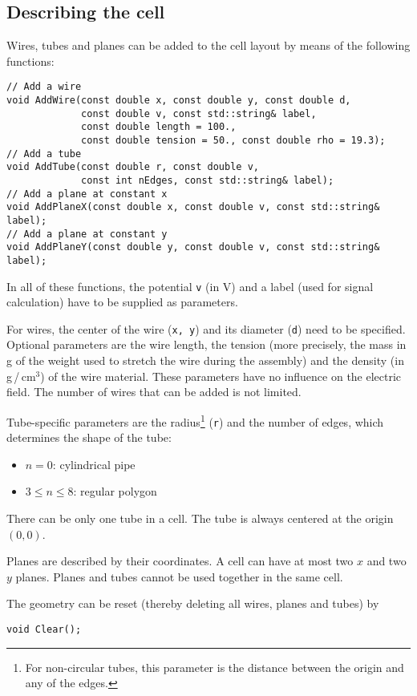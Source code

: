 \subsection{Describing the cell}

Wires, tubes and planes can be added to the cell layout by means of the 
following functions:
\begin{lstlisting}
// Add a wire
void AddWire(const double x, const double y, const double d,
             const double v, const std::string& label, 
             const double length = 100.,
             const double tension = 50., const double rho = 19.3);
// Add a tube
void AddTube(const double r, const double v, 
             const int nEdges, const std::string& label);
// Add a plane at constant x
void AddPlaneX(const double x, const double v, const std::string& label);
// Add a plane at constant y
void AddPlaneY(const double y, const double v, const std::string& label);

\end{lstlisting} 

In all of these functions, the potential \texttt{v} (in V) 
and a label (used for signal calculation) 
have to be supplied as parameters.
 
For wires, the center of the wire (\texttt{x, y}) 
and its diameter (\texttt{d}) need to be specified. 
Optional parameters are the wire length, the tension (more precisely, the 
mass in g of the weight used to stretch the wire during the assembly) and 
the density (in g\,/\,cm\(^{3}\)) of the wire material. 
These parameters have no influence on the electric field. 
The number of wires that can be added is not limited.

Tube-specific parameters are the radius\footnote{For non-circular tubes, this parameter is the distance between the origin and any of the edges.} (\texttt{r}) and the number of edges, which determines the shape of the tube:
  \begin{itemize}
    \item
    \(n = 0\): cylindrical pipe
    \item
    \(3 \le n \le 8\): regular polygon 
  \end{itemize}
There can be only one tube in a cell. 
The tube is always centered at the origin \(\left(0, 0\right)\).

Planes are described by their coordinates. 
A cell can have at most two \(x\) and two \(y\) planes. 
Planes and tubes cannot be used together in the same cell.

The geometry can be reset (thereby deleting all wires, planes and tubes) by
\begin{lstlisting}
void Clear();
\end{lstlisting}

